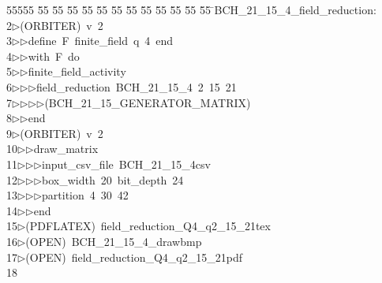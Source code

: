 %
%
\begin{tabbing}
55555 \= 55 \= 55 \= 55 \= 55 \= 55 \= 55 \= 55 \= 55 \= 55 \= 55 \= 55 \= 55 \= \>BCH\_21\_15\_4\_field\_reduction:\\[0pt]
2\>$\triangleright$\>(ORBITER)\ v\ 2\ \\[0pt]
3\>$\triangleright$\>$\triangleright$\>define\ F\ finite\_field\ q\ 4\ end\ \\[0pt]
4\>$\triangleright$\>$\triangleright$\>with\ F\ do\ \\[0pt]
5\>$\triangleright$\>$\triangleright$\>finite\_field\_activity\ \\[0pt]
6\>$\triangleright$\>$\triangleright$\>$\triangleright$\>field\_reduction\ BCH\_21\_15\_4\ 2\ 15\ 21\ \\[0pt]
7\>$\triangleright$\>$\triangleright$\>$\triangleright$\>$\triangleright$\>(BCH\_21\_15\_GENERATOR\_MATRIX)\ \\[0pt]
8\>$\triangleright$\>$\triangleright$\>end\\[0pt]
9\>$\triangleright$\>(ORBITER)\ v\ 2\ \\[0pt]
10\>$\triangleright$\>$\triangleright$\>draw\_matrix\ \\[0pt]
11\>$\triangleright$\>$\triangleright$\>$\triangleright$\>input\_csv\_file\ BCH\_21\_15\_4csv\ \\[0pt]
12\>$\triangleright$\>$\triangleright$\>$\triangleright$\>box\_width\ 20\ bit\_depth\ 24\ \\[0pt]
13\>$\triangleright$\>$\triangleright$\>$\triangleright$\>partition\ 4\ 30\ 42\ \\[0pt]
14\>$\triangleright$\>$\triangleright$\>end\\[0pt]
15\>$\triangleright$\>(PDFLATEX)\ field\_reduction\_Q4\_q2\_15\_21tex\\[0pt]
16\>$\triangleright$\>(OPEN)\ BCH\_21\_15\_4\_drawbmp\\[0pt]
17\>$\triangleright$\>(OPEN)\ field\_reduction\_Q4\_q2\_15\_21pdf\\[0pt]
18\>\end{tabbing}
